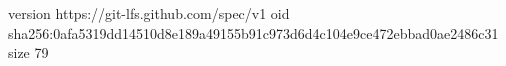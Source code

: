 version https://git-lfs.github.com/spec/v1
oid sha256:0afa5319dd14510d8e189a49155b91c973d6d4c104e9ce472ebbad0ae2486c31
size 79
